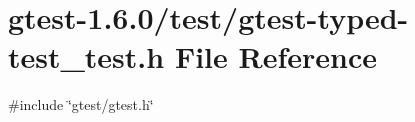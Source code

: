\hypertarget{gtest-typed-test__test_8h}{\section{gtest-\/1.6.0/test/gtest-\/typed-\/test\-\_\-test.h \-File \-Reference}
\label{de/d8b/gtest-typed-test__test_8h}
}
{\ttfamily \#include \char`\"{}gtest/gtest.\-h\char`\"{}}\*
